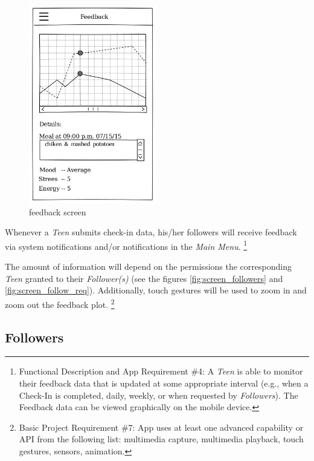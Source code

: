\documentclass{article}
\begin{document}
    \begin{figure}[h]
        \centering
        \includegraphics[width=0.5\textwidth,height=\textheight,keepaspectratio]{feedback.png}
        \caption{feedback screen}
        \label{fig:screen_feedback}
    \end{figure}
    
    Whenever a \emph{Teen} submits check-in data, his/her followers will receive feedback via system notifications and/or notifications in the \emph{Main Menu}. 
    \footnote{Functional Description and App Requirement \#4: A \emph{Teen} is able to monitor their feedback data that is updated at some appropriate interval (e.g., when a Check-In is completed, daily, weekly, or when requested by \emph{Followers}). The Feedback data can be viewed graphically on the mobile device.}

    The amount of information will depend on the permissions the corresponding \emph{Teen} granted to their \emph{Follower(s)} (see the figures \ref{fig:screen_followers} and \ref{fig:screen_follow_req}). Additionally, touch gestures will be used to zoom in and zoom out the feedback plot.
    \footnote{Basic Project Requirement \#7: App uses at least one advanced capability or API from the following list: multimedia capture, multimedia playback, touch gestures, sensors, animation.}

\newpage

    \subsection{Followers}
\end{document}
